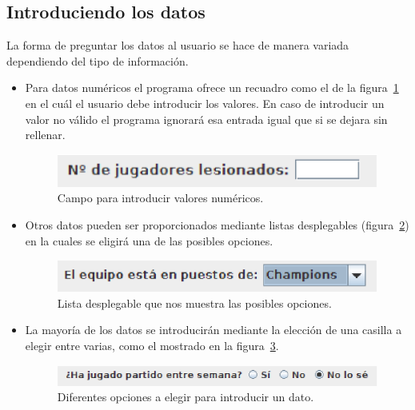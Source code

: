 \documentclass[a4paper,12pt]{article}
\begin{document}
\subsection{Introduciendo los datos}
La forma de preguntar los datos al usuario se hace de manera variada dependiendo del tipo de información.

\begin{itemize}
 \item Para datos numéricos el programa ofrece un recuadro como el de la figura~\ref{fig:campoNumerico} en el cuál el usuario debe introducir los valores.
  En caso de introducir un valor no válido el programa ignorará esa entrada igual que si se dejara sin rellenar.
\begin{figure}[h]
 \begin{center}
  \includegraphics[scale=0.8]{numerico.eps}
\caption{Campo para introducir valores numéricos.}
\label{fig:campoNumerico}
 \end{center}
\end{figure} 

 \item Otros datos pueden ser proporcionados mediante listas desplegables (figura~\ref{fig:listaDesplegable}) en la cuales se eligirá una de las posibles opciones.
\begin{figure}[h]
 \begin{center}
  \includegraphics[scale=0.8]{listaDesplegable.eps}
\caption{Lista desplegable que nos muestra las posibles opciones.}
\label{fig:listaDesplegable}
 \end{center}
\end{figure} 

 \item La mayoría de los datos se introducirán mediante la elección de una casilla a elegir entre varias, como el mostrado en la figura~\ref{fig:check}.
\begin{figure}[h]
 \begin{center}
  \includegraphics[scale=0.8]{check.eps}
\caption{Diferentes opciones a elegir para introducir un dato.}
\label{fig:check}
 \end{center}
\end{figure} 

\end{itemize}
\end{document}
